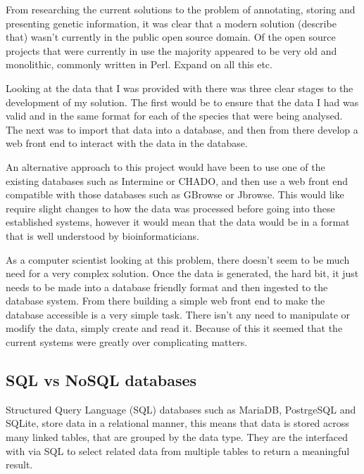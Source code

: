 From researching the current solutions to the problem of annotating, storing and presenting genetic information, it was clear that a modern solution (describe that) wasn't currently in the public open source domain. Of the open source projects that were currently in use the majority appeared to be very old and monolithic, commonly written in Perl. Expand on all this etc.


Looking at the data that I was provided with there was three clear stages to the development of my solution. The first would be to ensure that the data I had was valid and in the same format for each of the species that were being analysed. The next was to import that data into a database, and then from there develop a web front end to interact with the data in the database. 


An alternative approach to this project would have been to use one of the existing databases such as Intermine or CHADO, and then use a web front end compatible with those databases such as GBrowse or Jbrowse. This would like require slight changes to how the data was processed before going into these established systems, however it would mean that the data would be in a format that is well understood by bioinformaticians. 


As a computer scientist looking at this problem, there doesn't seem to be much need for a very complex solution. Once the data is generated, the hard bit, it just needs to be made into a database friendly format and then ingested to the database system. From there building a simple web front end to make the database accessible is a very simple task. There isn't any need to manipulate or modify the data, simply create and read it. Because of this it seemed that the current systems were greatly over complicating matters. 

  \subsection{SQL vs NoSQL databases}

  Structured Query Language (SQL) databases such as MariaDB, PostrgeSQL and SQLite, store data in a relational manner, this means that data is stored across many linked tables, that are grouped by the data type. They are the interfaced with via SQL to select related data from multiple tables to return a meaningful result. 
  
